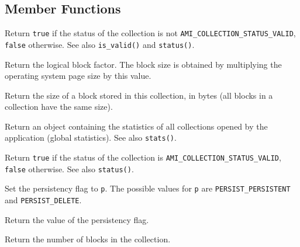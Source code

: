    \etabb

\subsection{Member Functions}

   \btabb

         {Return \lstinline|true| if
        the status of the collection is not
        \lstinline|AMI_COLLECTION_STATUS_VALID|, \lstinline|false|
        otherwise. See also \lstinline|is_valid()| and \lstinline|status()|.}

         {Return the logical
        block factor. The block size is obtained by multiplying the
        operating system page size by this value.}

         {Return the size of a block
        stored in this collection, in bytes (all blocks in a collection
        have the same size).}

        {Return an object containing the statistics of all collections
        opened by the application (global statistics). See also
        \lstinline|stats()|.}

         {Return \lstinline|true| if the status
        of the collection is \lstinline|AMI_COLLECTION_STATUS_VALID|, \lstinline|false|
        otherwise. See also \lstinline|status()|.}

         {Set the persistency flag to
        \lstinline|p|. The possible values for \lstinline|p| are 
        \lstinline|PERSIST_PERSISTENT| and \lstinline|PERSIST_DELETE|.}

         {Return the value of the 
        persistency flag.}

         {Return the number of blocks in the
        collection.}

